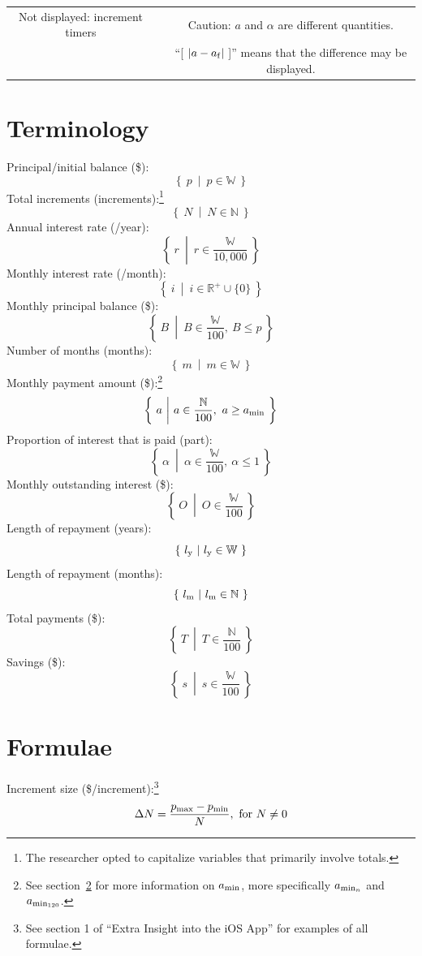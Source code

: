 \documentclass[12pt,letterpaper,oneside]{article}
\theoremstyle{remark} %
\begin{document}
\begin{table}[H]
{\begin{minipage}{1.25\textwidth}
\begin{tabular}{c c c}
	Not displayed: increment timers & \qquad\qquad & Caution: $a$ and $\alpha$ are different quantities. \\
	& & ``[ $\left|a-a_{\rm{f}}\right|$ ]'' means that the difference may be displayed. \\
	\end{tabular}
	\end{minipage}
	}
	\end{table}

	\newpage

\section{Terminology}

	Principal/initial balance (\$):
	$$\left\{\ p\ \middle|\ p\in\mathbb{W}\ \right\}$$
	Total increments (increments):\footnote{The researcher opted to capitalize variables that primarily involve totals.}
	$$\left\{\ N\ \middle|\ N\in\mathbb{N}\ \right\}$$
	Annual interest rate (/year):
	$$\left\{\ r\ \middle|\ r\in\frac{\mathbb{W}}{10,000}\ \right\}$$
	Monthly interest rate (/month):
	$$\left\{\ i\ \middle|\ i\in\mathbb{R}^{+}\cup\{0\}\ \right\}$$
	Monthly principal balance (\$):
	$$\left\{\ B\ \middle|\ B\in\frac{\mathbb{W}}{100},\ B\leq p\ \right\}$$
	Number of months (months):
	$$\left\{\ m\ \middle|\ m\in\mathbb{W}\ \right\}$$
	Monthly payment amount (\$):\footnote{See section~\ref{section2} for more information on $a_{\rm{min}}$, more specifically $a_{\rm{min_{\mathnormal{n}}}}$ and $a_{\rm{min_{120}}}$.}
	$$\left\{\ a\ \middle|\ a\in\frac{\mathbb{N}}{100},\ a\geq a_{\rm{min}}\ \right\}$$
	Proportion of interest that is paid (part):
	$$\left\{\ \alpha\ \middle|\ \alpha\in\frac{\mathbb{W}}{100},\ \alpha\leq 1\ \right\}$$
	Monthly outstanding interest (\$):
	$$\left\{\ O\ \middle|\ O\in\frac{\mathbb{W}}{100}\ \right\}$$
	Length of repayment (years):
	$$\left\{\ l_{\rm{y}}\ \middle|\ l_{\rm{y}}\in\mathbb{W}\ \right\}$$
	Length of repayment (months):
	$$\left\{\ l_{\rm{m}}\ \middle|\ l_{\rm{m}}\in\mathbb{N}\ \right\}$$
	Total payments (\$):
	$$\left\{\ T\ \middle|\ T\in\frac{\mathbb{N}}{100}\ \right\}$$
	Savings (\$):
	$$\left\{\ s\ \middle|\ s\in\frac{\mathbb{W}}{100}\ \right\}$$

	\newpage

\section{Formulae}\label{section2}

	Increment size (\$/increment):\footnote{See section 1 of ``Extra Insight into the iOS App'' for examples of all formulae.}
	$$\Delta N=\frac{p_{\rm{max}}-p_{\rm{min}}}{N},\mbox{ for }N\neq 0$$
\end{document}
